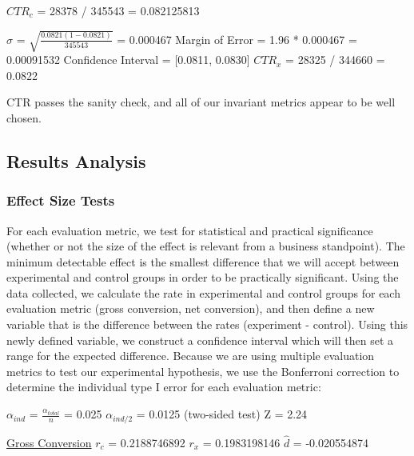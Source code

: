 \documentclass[paper=a4, fontsize=11pt]{scrartcl} %
\numberwithin{equation}{section} %
\numberwithin{figure}{section} %
\numberwithin{table}{section} %
\begin{document}
$CTR_{c}$ = 28378 / 345543 = 0.082125813

$\sigma$ = $\sqrt{\frac{0.0821(1-0.0821)}{345543}}$ = 0.000467
\newline
Margin of Error = 1.96 * 0.000467 = 0.00091532
\newline
Confidence Interval = [0.0811, 0.0830]
\newline
$CTR_{x}$ = 28325 / 344660 = 0.0822
\newline

CTR passes the sanity check, and all of our invariant metrics appear to be well chosen. \newline


\subsection{Results Analysis}

\subsubsection{Effect Size Tests}

For each evaluation metric, we test for statistical and practical significance (whether or not the size of the effect is relevant from a business standpoint).  The minimum detectable effect is the smallest difference that we will accept between experimental and control groups in order to be practically significant.  Using the data collected, we calculate the rate in experimental and control groups for each evaluation metric (gross conversion, net conversion), and then define a new variable that is the difference between the rates (experiment - control).  Using this newly defined variable, we construct a confidence interval which will then set a range for the expected difference.  Because we are using multiple evaluation metrics to test our experimental hypothesis, we use the Bonferroni correction to determine the individual type I error for each evaluation metric: \newline

$\alpha_{ind}$ = $\frac{\alpha_{total}}{n}$ = 0.025
\newline
$\alpha_{ind/2}$ = 0.0125 (two-sided test)
\newline
Z = 2.24
\newline
\newline

\underline{Gross Conversion} \newline
\newline
$r_{c}$ = 0.2188746892
\quad
$r_{x}$ = 0.1983198146
\quad
$\widehat{d}$ = -0.020554874
\newline
\end{document}
